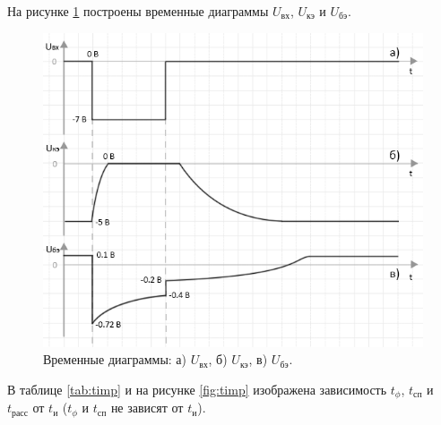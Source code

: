 На рисунке \ref{fig:time} построены временные диаграммы $U_\text{вх}$, $U_\text{кэ}$ и $U_\text{бэ}$.

\begin{figure}[H]
	\begin{center}
		\includegraphics[width=15cm]{img/time}
		\caption{Временные диаграммы: а) $U_\text{вх}$, б) $U_\text{кэ}$, в) $U_\text{бэ}$.}
		\label{fig:time}
	\end{center}
\end{figure}

В таблице \ref{tab:timp} и на рисунке \ref{fig:timp} изображена зависимость $t_\phi$, $t_\text{сп}$ и $t_\text{расс}$ от $t_\text{и}$ ($t_\phi$ и $t_\text{сп}$ не зависят от $t_\text{и}$).

